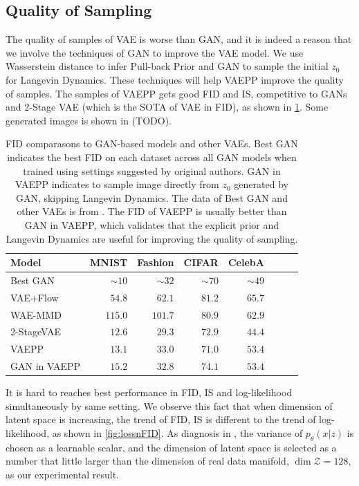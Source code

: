 \subsection{Quality of Sampling}
The quality of samples of VAE is worse than GAN, and it is indeed a reason that we involve the techniques of GAN to improve the VAE model. We use  Wasserstein distance to infer Pull-back Prior and GAN to sample the initial $z_0$ for Langevin Dynamics. These techniques will help VAEPP improve the quality of samples. The samples of VAEPP gets good FID and IS, competitive to GANs and 2-Stage VAE (which is the SOTA of VAE in FID), as shown in \cref{tab:compare_FID}. Some generated images is shown in (TODO).
\begin{table}[tb]
\centering
\begin{tabular}{lrrrrrrr}  
\toprule
Model & MNIST & Fashion & CIFAR & CelebA\\
\midrule
Best GAN   & $\sim10$& $\sim32$&$\sim70$& $\sim49$\\
VAE+Flow   & $54.8$ & $62.1$  & $81.2$ & $65.7$\\
WAE-MMD    & $115.0$ & $101.7$ & $80.9$ & $62.9$\\
2-StageVAE & $12.6$  & $29.3$  & $72.9$ & $44.4$\\
VAEPP      & $13.1$  & $33.0$  & $71.0$ & $53.4$ \\
GAN in VAEPP & $15.2$ & $32.8$  & $74.1$  & $53.4$ \\
\bottomrule
\end{tabular} 
\caption{FID comparasons to GAN-based models and other VAEs. Best GAN indicates the best FID on each dataset across all GAN models when trained using settings suggested by original authors. GAN in VAEPP indicates to sample image directly from $z_0$ generated by GAN, skipping Langevin Dynamics. The data of Best GAN and other VAEs is from \protect\cite{dai2019diagnosing}. The FID of VAEPP is usually better than GAN in VAEPP, which validates that the explicit prior and Langevin Dynamics are useful for improving the quality of sampling.
}\label{tab:compare_FID}
\end{table}

It is hard to reaches best performance in FID, IS and log-likelihood simultaneously by same setting. We observe this fact that when dimension of latent space is increasing, the trend of FID, IS is different to the trend of log-likelihood, as shown in \cref{fig:lossnFID}. As diagnosis in \cite{dai2019diagnosing}, the variance of $p_\theta(x|z)$ is chosen as a learnable scalar, and the dimension of latent space is selected as a number that little larger than the dimension of real data manifold, $\dim \mathcal{Z} = 128$, as our experimental result.  


